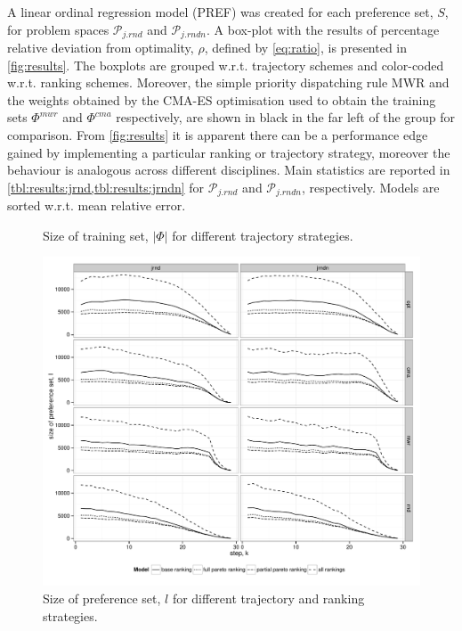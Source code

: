 \documentclass[smallextended]{llncs}
\begin{document}
A linear ordinal regression model (PREF) was created for each preference set, $S$, for problem spaces $\mathcal{P}_{j.rnd}$ and $\mathcal{P}_{j.rndn}$. A box-plot with the results of percentage relative deviation from optimality, $\rho$, defined by \cref{eq:ratio}, is presented in \cref{fig:results}. The boxplots are grouped w.r.t. trajectory schemes and color-coded w.r.t. ranking schemes. 
Moreover, the simple priority dispatching rule MWR and the weights obtained by the CMA-ES optimisation used to obtain the training sets $\Phi^{mwr}$ and $\Phi^{cma}$ respectively, are shown in black in the far left of the group for comparison.
From \cref{fig:results} it is apparent there can be a performance edge gained by implementing a particular ranking or trajectory strategy, moreover the behaviour is analogous across different disciplines. 
Main statistics are reported in \cref{tbl:results:jrnd,tbl:results:jrndn} for $\mathcal{P}_{j.rnd}$ and $\mathcal{P}_{j.rndn}$, respectively. Models are sorted w.r.t. mean relative error.

\begin{figure} \centering
{}	
\caption{Size of training set, $|\Phi|$ for different trajectory strategies.}
\label{fig:sizeoftrset}
\end{figure}
\begin{figure} \centering
\includegraphics[width=\columnwidth]{figures/numTrainingData}
\caption{Size of preference set, $l$ for different trajectory and ranking strategies.}
\label{fig:sizeofprefset}
\end{figure}
\end{document}
